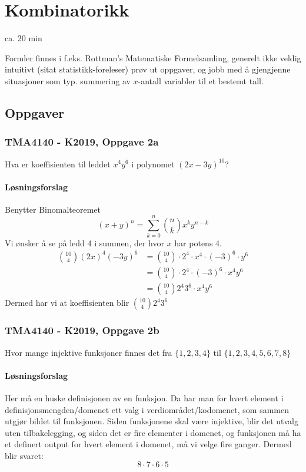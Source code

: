 \section{Kombinatorikk}
ca. 20 min

\noindent Formler finnes i f.eks. Rottman's Matematiske Formelsamling, generelt ikke veldig intuitivt (sitat statistikk-foreleser)
prøv ut oppgaver, og jobb med å gjengjenne situasjoner som typ. summering av $x$-antall variabler til et bestemt tall.

\subsection{Oppgaver}
\subsubsection{TMA4140 - K2019, Oppgave 2a}
Hva er koeffisienten til leddet $x^4 y^6$ i polynomet $(2x-3y)^{10}$?

\paragraph*{Løsningsforslag}

Benytter Binomalteoremet
\[
(x+y)^n=\sum_{k=0}^{n}\binom{n}{k} x^k y^{n-k}
\]
Vi ønsker å se på ledd 4 i summen, der hvor $x$ har potens 4.
\begin{align}
    \binom{10}{4}(2x)^4(-3y)^6 &= \binom{10}{4}\cdot 2^4 \cdot x^4 \cdot (-3)^6 \cdot y^6\\
    &= \binom{10}{4}\cdot 2^4 \cdot (-3)^6 \cdot x^4 y^6\\
    &= \binom{10}{4} 2^4 3^6 \cdot x^4 y^6
\end{align}
Dermed har vi at koeffisienten blir $\binom{10}{4} 2^4 3^6 $

\subsubsection{TMA4140 - K2019, Oppgave 2b}
Hvor mange injektive funksjoner finnes det fra $\{1,2,3,4\}$ til $\{1,2,3,4,5,6,7,8\}$

\paragraph*{Løsningsforslag} 

Her må en huske definisjonen av en funksjon. Da har man for hvert element i definisjonsmengden/domenet 
ett valg i verdiområdet/kodomenet, som sammen utgjør bildet til funksjonen. Siden funksjonene skal være
injektive, blir det utvalg uten tilbakelegging, og siden det er fire elementer i domenet, og funksjonen
må ha et definert output for hvert element i domenet, må vi velge fire ganger. Dermed blir svaret:
\[
8\cdot 7 \cdot 6\cdot 5   
\]